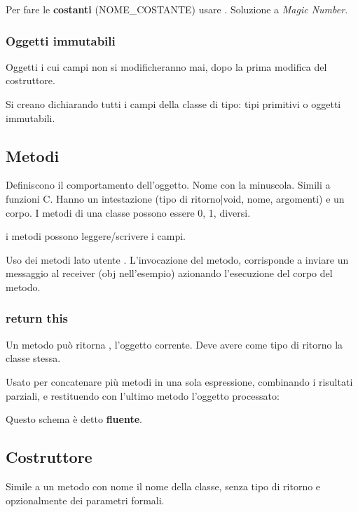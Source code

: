 
Per fare le \textbf{costanti} (NOME\_COSTANTE) usare . Soluzione a \textit{Magic Number}.

\subsubsection{Oggetti immutabili}
Oggetti i cui campi non si modificheranno mai, dopo la prima modifica del costruttore.

Si creano dichiarando  tutti i campi della classe di tipo: tipi primitivi o oggetti immutabili.

\subsection{Metodi}
Definiscono il comportamento dell'oggetto. Nome con la minuscola.
Simili a funzioni C. Hanno un intestazione (tipo di ritorno|void, nome, argomenti) e un corpo.
I metodi di una classe possono essere 0, 1, diversi.

i metodi possono leggere/scrivere i campi.

Uso dei metodi lato utente . L'invocazione del metodo, corrisponde a inviare un messaggio al receiver (obj nell'esempio) azionando l'esecuzione del corpo del metodo.


\subsubsection{return this}
Un metodo può ritorna , l'oggetto corrente. Deve avere come tipo di ritorno la classe stessa.

Usato per concatenare più metodi in una sola espressione, combinando i risultati parziali, e restituendo con l'ultimo metodo l'oggetto processato:


Questo schema è detto \textbf{fluente}.

\subsection{Costruttore}
Simile a un metodo con nome il nome della classe, senza tipo di ritorno e opzionalmente dei parametri formali.

